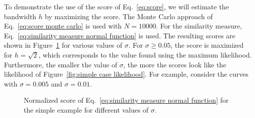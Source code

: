 \documentclass[10pt,final,a4paper,oneside,onecolumn]{article}
\newlength\figurewidth
\newlength\figureheight
\theoremstyle{plain}\newtheorem{definition}{Definition}[section]    %
\theoremstyle{definition}\newtheorem{example}{Example}[section]     %
\theoremstyle{remark}\newtheorem{remarkenv}{Remark}[section]        %
\begin{document}
To demonstrate the use of the score of Eq.~\eqref{eq:score}, we will estimate the bandwidth $h$ by maximizing the score. The Monte Carlo approach of Eq.~\eqref{eq:score monte carlo} is used with $N=10000$. For the similarity measure, Eq.~\eqref{eq:similarity measure normal function} is used. The resulting scores are shown in Figure~\ref{fig:simple case scores} for various values of $\sigma$. For $\sigma \geq 0.05$, the score is maximized for $h=\sqrt{2}$, which corresponds to the value found using the maximum likelihood. Furthermore, the smaller the value of $\sigma$, the more the scores look like the likelihood of Figure~\ref{fig:simple case likelihood}. For example, consider the curves with $\sigma=0.005$ and $\sigma=0.01$.

\begin{figure}
	\centering
	\setlength\figureheight{200pt}
	\setlength\figurewidth{300pt}
	
	\caption{Normalized score of Eq.~\eqref{eq:similarity measure normal function} for the simple example for different values of $\sigma$.}
	\label{fig:simple case scores}
\end{figure}


\end{document}
